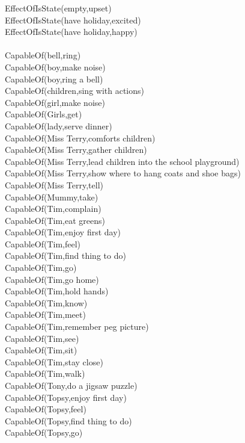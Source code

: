 \begin{multicols}{2}
\begin{footnotesize}
EffectOfIsState(empty,upset) \\
EffectOfIsState(have holiday,excited) \\
EffectOfIsState(have holiday,happy) \\
~\\
CapableOf(bell,ring) \\
CapableOf(boy,make noise) \\
CapableOf(boy,ring a bell) \\
CapableOf(children,sing with actions) \\
CapableOf(girl,make noise) \\
CapableOf(Girls,get) \\
CapableOf(lady,serve dinner) \\
CapableOf(Miss Terry,comforts children) \\
CapableOf(Miss Terry,gather children) \\
CapableOf(Miss Terry,lead children into the school playground) \\
CapableOf(Miss Terry,show where to hang coats and shoe bags) \\
CapableOf(Miss Terry,tell) \\
CapableOf(Mummy,take) \\
CapableOf(Tim,complain) \\
CapableOf(Tim,eat greens) \\
CapableOf(Tim,enjoy first day) \\
CapableOf(Tim,feel) \\
CapableOf(Tim,find thing to do) \\
CapableOf(Tim,go) \\
CapableOf(Tim,go home) \\
CapableOf(Tim,hold hands) \\
CapableOf(Tim,know) \\
CapableOf(Tim,meet) \\
CapableOf(Tim,remember peg picture) \\
CapableOf(Tim,see) \\
CapableOf(Tim,sit) \\
CapableOf(Tim,stay close) \\
CapableOf(Tim,walk) \\
CapableOf(Tony,do a jigsaw puzzle) \\
CapableOf(Topsy,enjoy first day) \\
CapableOf(Topsy,feel) \\
CapableOf(Topsy,find thing to do) \\
CapableOf(Topsy,go) \\

\end{footnotesize}
\end{multicols}
